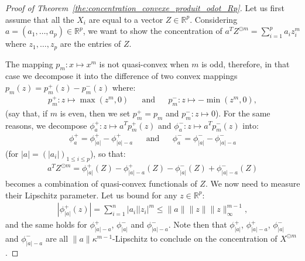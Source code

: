 \documentclass{ws-rmta}
\begin{document}
\begin{proof}[Proof of Theorem~\ref{the:concentration_convexe_produit_odot_Rp}]
  Let us first assume that all the $X_i$ are equal to a vector $Z \in \mathbb R^p$. 
  Considering $a = (a_1,\ldots, a_p) \in \mathbb R^p$, we want to show the concentration of $a^T Z^{\odot m} = \sum_{i=1}^p a_i z_i^m$ where $z_1,\ldots,z_p$ are the entries of $Z$. 
  
  The mapping $p_m : x \mapsto x^m $ is not quasi-convex when $m$ is odd, therefore, in that case we decompose it into the difference of two convex mappings $p_m(z) = p_m^+(z) - p_m^-(z)$ where:
  \begin{align}\label{eq:decomposition_convexe_puissance}
    p_m^+: z \mapsto \max(z^m,0)&
    &\text{and}&
    &p^-_m: z \mapsto -\min(z^m,0),
   \end{align} 
  (say that, if $m$ is even, then we set $p_m^+ = p_m$ and $p_m^- : z \mapsto 0$).
  For the same reasons, we decompose $\phi^+_a : z \mapsto a^T p_m^+(z)$ and $\phi^-_a : z \mapsto a^T p_m^-(z)$ into:  
  \begin{align*}
     \phi^+_a = \phi^+_{| a|} - \phi^+_{|a|- a}&
     &\text{and}&
     &\phi^-_a = \phi^-_{| a|} - \phi^-_{|a|- a}
   \end{align*}
   (for $|a| = (|a_i|)_{1\leq i \leq p}$), so that:
  \begin{align*}
    a^T Z^{\odot m} = \phi^+_{| a|}(Z) - \phi^+_{|a|- a}(Z) - \phi^-_{| a|}(Z) + \phi^-_{|a|- a}(Z)
  \end{align*}
  becomes a combination of quasi-convex functionals of $Z$. We now need to measure their Lipschitz parameter. Let us bound for any $z \in \mathbb R^p$:
  \begin{align*}
    \left\vert \phi^+_{| a|}(z)\right\vert = \sum_{i=1}^n |a_i| |z_i|^m \leq \|a\|\|z\| \|z\|_\infty^{m-1},
  \end{align*}
  and the same holds for $\phi^+_{|a|- a}$, $\phi^-_{| a|}$ and $\phi^-_{|a|- a}$. 
  Note then that $\phi^+_{|a|}$, $\phi^+_{|a|- a}$, $\phi^-_{| a|}$ and $\phi^-_{|a|- a}$ are all $\|a\| \kappa^{m-1}$-Lipschitz to conclude on the concentration of $X^{\odot m}$.

\end{proof}
\end{document}
